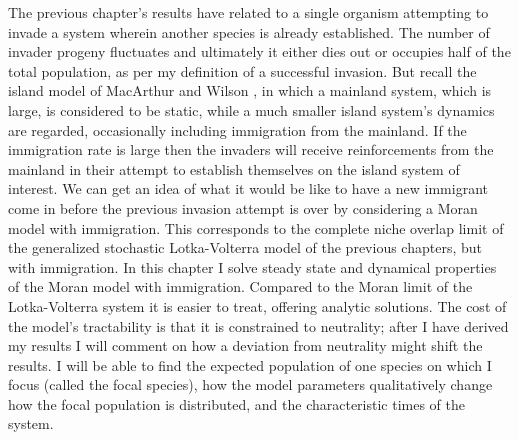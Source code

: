 \iffalse
The previous chapter's results have related to a single organism attempting to invade a system wherein another species is already established. 
The number of invader progeny fluctuates and ultimately it either dies out or occupies half of the total population, as per my definition of a successful invasion. 
But recall the island model of MacArthur and Wilson \cite{MacArthur1967}, in which a mainland system, which is large, is considered to be static, while a much smaller island system's dynamics are regarded, occasionally including immigration from the mainland. 
If the immigration rate is large then the invaders will receive reinforcements from the mainland in their attempt to establish themselves on the island system of interest. 
We can get an idea of what it would be like to have a new immigrant come in before the previous invasion attempt is over by considering a Moran model with immigration.
This corresponds to the complete niche overlap limit of the generalized stochastic Lotka-Volterra model of the previous chapters, but with immigration. 
In this chapter I solve steady state and dynamical properties of the Moran model with immigration. 
Compared to the Moran limit of the Lotka-Volterra system it is easier to treat, offering analytic solutions. %
The cost of the model's tractability is that it is constrained to neutrality; after I have derived my results I will comment on how a deviation from neutrality might shift the results. 
I will be able to find the expected population of one species on which I focus (called the focal species), how the model parameters qualitatively change how the focal population is distributed, and the characteristic times of the system. 

